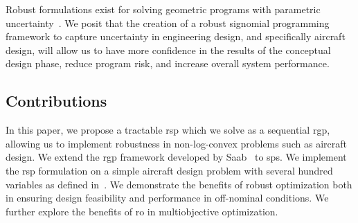 Robust formulations exist for solving geometric programs with parametric uncertainty~\cite{Saab2018}.
We posit that the creation of a robust signomial programming framework to capture uncertainty in engineering
design, and specifically aircraft design, will allow us to have more confidence in the results
of the conceptual design phase, reduce program risk, and increase overall system performance.

\subsection{Contributions}

In this paper, we propose a tractable \gls{rsp} which we solve as a sequential \gls{rgp},
allowing us to implement robustness in non-log-convex problems such as aircraft design.
We extend the \gls{rgp} framework developed by Saab~\cite{Saab2018} to \gls{sp}s.
We implement the \gls{rsp} formulation on a simple aircraft design problem with several hundred
variables as defined in~\cite{Ozturk2018}.
We demonstrate the benefits of robust optimization both in ensuring design feasibility and performance
in off-nominal conditions. We further explore the benefits of \gls{ro} in multiobjective optimization.



